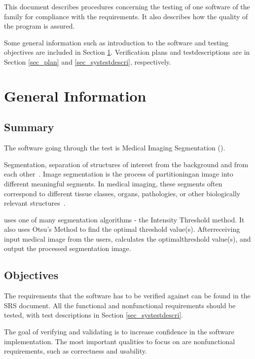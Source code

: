 \documentclass[12pt, titlepage]{article}
\begin{document}
\newpage


This document describes procedures concerning the testing of one software of
the \famname{} family for compliance with the requirements. It also describes how the
quality of the program is assured.

Some general information such as introduction to the software and testing
objectives are included in Section \ref{sec_geinfo}. Verification plans and
testdescriptions are in Section \ref{sec_plan} and \ref{sec_systestdescri},
respectively.

\section{General Information} \label{sec_geinfo}

\subsection{Summary}

The software going through the test is Medical Imaging Segmentation
(\progname{}).

Segmentation, separation of structures of interest from the background and from
each other~\cite{Bankman2000}. Image segmentation is the process of
partitioningan image into different meaningful segments. In medical imaging,
these segments
often correspond to different tissue classes, organs, pathologies, or other
biologically relevant structures~\cite{Forouzanfar2010}.

\progname{} uses one of many segmentation algorithms - the Intensity Threshold
method. It also uses Otsu's Method to find the optimal threshold value(s).
Afterreceiving input medical image from the users, \progname{} calculates the
optimalthreshold value(s), and output the processed segmentation image.

\subsection{Objectives}
\label{Sec_objectives}
The requirements that the software has to be verified against can be found in
the SRS document. All the functional and nonfunctional requirements should be
tested, with test descriptions in Section \ref{sec_systestdescri}.

The goal of verifying and validating is to increase confidence in the software
implementation. The most important qualities to focus on are nonfunctional
requirements, such as correctness and usability.
\end{document}
